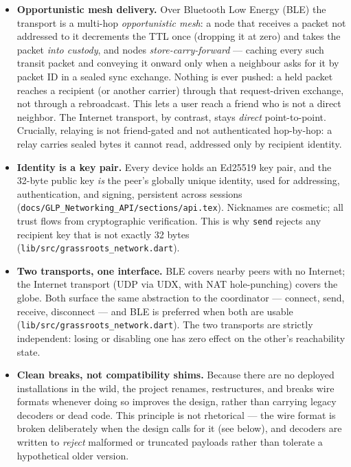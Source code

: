 \documentclass[11pt]{report}
\newcommand{\code}[1]{\texttt{\small #1}}
\begin{document}
\begin{itemize}
  \item \textbf{Opportunistic mesh delivery.} Over Bluetooth Low Energy (BLE) the transport is a multi-hop \emph{opportunistic mesh}: a node that receives a packet not addressed to it decrements the TTL once (dropping it at zero) and takes the packet \emph{into custody}, and nodes \emph{store-carry-forward} — caching every such transit packet and conveying it onward only when a neighbour asks for it by packet ID in a sealed sync exchange. Nothing is ever pushed: a held packet reaches a recipient (or another carrier) through that request-driven exchange, not through a rebroadcast. This lets a user reach a friend who is not a direct neighbor. The Internet transport, by contrast, stays \emph{direct} point-to-point. Crucially, relaying is not friend-gated and not authenticated hop-by-hop: a relay carries sealed bytes it cannot read, addressed only by recipient identity.
  \item \textbf{Identity is a key pair.} Every device holds an Ed25519 key pair, and the 32-byte public key \emph{is} the peer's globally unique identity, used for addressing, authentication, and signing, persistent across sessions (\code{docs/GLP_Networking_API/sections/api.tex}). Nicknames are cosmetic; all trust flows from cryptographic verification. This is why \code{send} rejects any recipient key that is not exactly 32 bytes (\code{lib/src/grassroots_network.dart}).
  \item \textbf{Two transports, one interface.} BLE covers nearby peers with no Internet; the Internet transport (UDP via UDX, with NAT hole-punching) covers the globe. Both surface the same abstraction to the coordinator — connect, send, receive, disconnect — and BLE is preferred when both are usable (\code{lib/src/grassroots_network.dart}). The two transports are strictly independent: losing or disabling one has zero effect on the other's reachability state.
  \item \textbf{Clean breaks, not compatibility shims.} Because there are no deployed installations in the wild, the project renames, restructures, and breaks wire formats whenever doing so improves the design, rather than carrying legacy decoders or dead code. This principle is not rhetorical — the wire format is broken deliberately when the design calls for it (see below), and decoders are written to \emph{reject} malformed or truncated payloads rather than tolerate a hypothetical older version.
\end{itemize}
\end{document}
